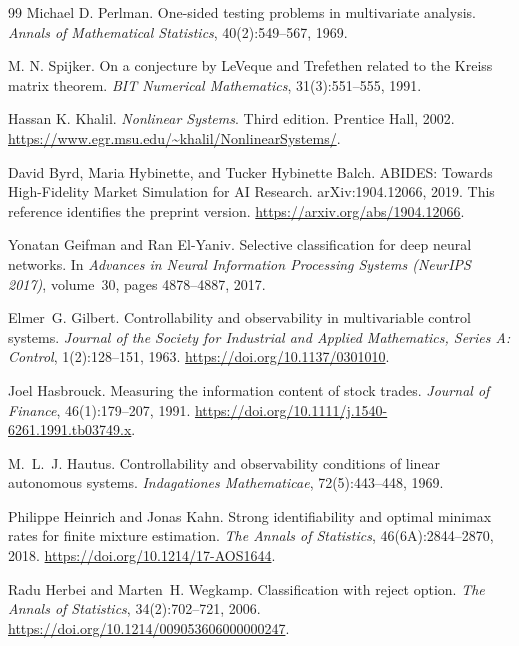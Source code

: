 \documentclass[10pt,twocolumn,letterpaper]{article}
\theoremstyle{definition}
\theoremstyle{remark}
\begin{document}
\begin{thebibliography}{99}
Michael D. Perlman.
\newblock One-sided testing problems in multivariate analysis.
\newblock \emph{Annals of Mathematical Statistics}, 40(2):549--567, 1969.

M. N. Spijker.
\newblock On a conjecture by LeVeque and Trefethen related to the Kreiss matrix theorem.
\newblock \emph{BIT Numerical Mathematics}, 31(3):551--555, 1991.

Hassan K. Khalil.
\newblock \emph{Nonlinear Systems}. Third edition.
\newblock Prentice Hall, 2002.
\newblock \url{https://www.egr.msu.edu/~khalil/NonlinearSystems/}.

David Byrd, Maria Hybinette, and Tucker Hybinette Balch.
\newblock ABIDES: Towards High-Fidelity Market Simulation for AI Research.
\newblock arXiv:1904.12066, 2019. This reference identifies the preprint version.
\newblock \url{https://arxiv.org/abs/1904.12066}.

Yonatan Geifman and Ran El-Yaniv.
\newblock Selective classification for deep neural networks.
\newblock In \emph{Advances in Neural Information Processing Systems (NeurIPS 2017)}, volume~30, pages 4878--4887, 2017.

Elmer~G. Gilbert.
\newblock Controllability and observability in multivariable control systems.
\newblock \emph{Journal of the Society for Industrial and Applied Mathematics, Series A: Control}, 1(2):128--151, 1963.
\newblock \url{https://doi.org/10.1137/0301010}.

Joel Hasbrouck.
\newblock Measuring the information content of stock trades.
\newblock \emph{Journal of Finance}, 46(1):179--207, 1991.
\newblock \url{https://doi.org/10.1111/j.1540-6261.1991.tb03749.x}.

M.~L.~J. Hautus.
\newblock Controllability and observability conditions of linear autonomous systems.
\newblock \emph{Indagationes Mathematicae}, 72(5):443--448, 1969.

Philippe Heinrich and Jonas Kahn.
\newblock Strong identifiability and optimal minimax rates for finite mixture estimation.
\newblock \emph{The Annals of Statistics}, 46(6A):2844--2870, 2018.
\newblock \url{https://doi.org/10.1214/17-AOS1644}.

Radu Herbei and Marten~H. Wegkamp.
\newblock Classification with reject option.
\newblock \emph{The Annals of Statistics}, 34(2):702--721, 2006.
\newblock \url{https://doi.org/10.1214/009053606000000247}.


\end{thebibliography}
\end{document}
